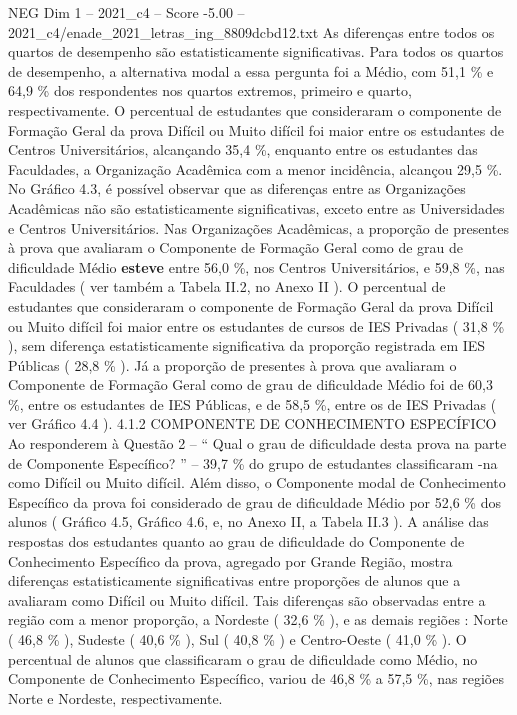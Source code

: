 \begin{textsample}{NEG Dim 1 – 2021\_c4 – Score -5.00 – 2021\_c4/enade\_2021\_letras\_ing\_8809dcbd12.txt}
As diferenças entre todos os quartos de desempenho são estatisticamente significativas.
Para todos os quartos de desempenho, a alternativa modal a essa pergunta foi a Médio, com 51,1 \% e 64,9 \% dos respondentes nos quartos extremos, primeiro e quarto, respectivamente.
O percentual de estudantes que consideraram o componente de Formação Geral da prova Difícil ou Muito difícil foi maior entre os estudantes de Centros Universitários, alcançando 35,4 \%, enquanto entre os estudantes das Faculdades, a Organização Acadêmica com a menor incidência, alcançou 29,5 \%.
No Gráfico 4.3, é possível observar que as diferenças entre as Organizações Acadêmicas não são estatisticamente significativas, exceto entre as Universidades e Centros Universitários.
Nas Organizações Acadêmicas, a proporção de presentes à prova que avaliaram o Componente de Formação Geral como de grau de dificuldade Médio \textbf{esteve} entre 56,0 \%, nos Centros Universitários, e 59,8 \%, nas Faculdades ( ver também a Tabela II.2, no Anexo II ).
O percentual de estudantes que consideraram o componente de Formação Geral da prova Difícil ou Muito difícil foi maior entre os estudantes de cursos de IES Privadas ( 31,8 \% ), sem diferença estatisticamente significativa da proporção registrada em IES Públicas ( 28,8 \% ).
Já a proporção de presentes à prova que avaliaram o Componente de Formação Geral como de grau de dificuldade Médio foi de 60,3 \%, entre os estudantes de IES Públicas, e de 58,5 \%, entre os de IES Privadas ( ver Gráfico 4.4 ). 4.1.2 COMPONENTE DE CONHECIMENTO ESPECÍFICO Ao responderem à Questão 2 – “ Qual o grau de dificuldade desta prova na parte de Componente Específico? ” – 39,7 \% do grupo de estudantes classificaram -na como Difícil ou Muito difícil.
Além disso, o Componente modal de Conhecimento Específico da prova foi considerado de grau de dificuldade Médio por 52,6 \% dos alunos ( Gráfico 4.5, Gráfico 4.6, e, no Anexo II, a Tabela II.3 ).
A análise das respostas dos estudantes quanto ao grau de dificuldade do Componente de Conhecimento Específico da prova, agregado por Grande Região, mostra diferenças estatisticamente significativas entre proporções de alunos que a avaliaram como Difícil ou Muito difícil.
Tais diferenças são observadas entre a região com a menor proporção, a Nordeste ( 32,6 \% ), e as demais regiões : Norte ( 46,8 \% ), Sudeste ( 40,6 \% ), Sul ( 40,8 \% ) e Centro-Oeste ( 41,0 \% ).
O percentual de alunos que classificaram o grau de dificuldade como Médio, no Componente de Conhecimento Específico, variou de 46,8 \% a 57,5 \%, nas regiões Norte e Nordeste, respectivamente.

\end{textsample}
